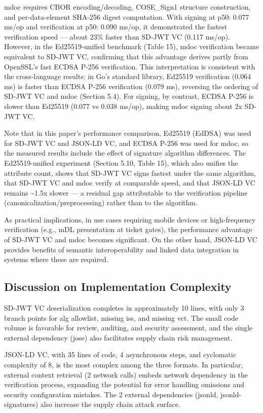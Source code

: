 \documentclass[conference]{IEEEtran}
\begin{document}
mdoc requires CBOR encoding/decoding, COSE\_Sign1 structure construction, and per-data-element SHA-256 digest computation. With signing at p50: 0.077 ms/op and verification at p50: 0.090 ms/op, it demonstrated the fastest verification speed --- about 23\% faster than SD-JWT VC (0.117 ms/op). However, in the Ed25519-unified benchmark (Table 15), mdoc verification became equivalent to SD-JWT VC, confirming that this advantage derives partly from OpenSSL's fast ECDSA P-256 verification. This interpretation is consistent with the cross-language results: in Go's standard library, Ed25519 verification (0.064 ms) is faster than ECDSA P-256 verification (0.079 ms), reversing the ordering of SD-JWT VC and mdoc (Section 5.4). For signing, by contrast, ECDSA P-256 is slower than Ed25519 (0.077 vs 0.038 ms/op), making mdoc signing about 2x SD-JWT VC.

Note that in this paper's performance comparison, Ed25519 (EdDSA) was used for SD-JWT VC and JSON-LD VC, and ECDSA P-256 was used for mdoc, so the measured results include the effect of signature algorithm differences. The Ed25519-unified experiment (Section 5.10, Table 15), which also unifies the attribute count, shows that SD-JWT VC signs fastest under the same algorithm, that SD-JWT VC and mdoc verify at comparable speed, and that JSON-LD VC remains \textasciitilde1.5x slower --- a residual gap attributable to the verification pipeline (canonicalization/preprocessing) rather than to the algorithm.

As practical implications, in use cases requiring mobile devices or high-frequency verification (e.g., mDL presentation at ticket gates), the performance advantage of SD-JWT VC and mdoc becomes significant. On the other hand, JSON-LD VC provides benefits of semantic interoperability and linked data integration in systems where these are required.

\subsection{Discussion on Implementation Complexity}

SD-JWT VC deserialization completes in approximately 10 lines, with only 3 branch points for alg allowlist, missing iss, and missing vct. The small code volume is favorable for review, auditing, and security assessment, and the single external dependency (jose) also facilitates supply chain risk management.

JSON-LD VC, with 35 lines of code, 4 asynchronous steps, and cyclomatic complexity of 8, is the most complex among the three formats. In particular, external context retrieval (2 network calls) embeds network dependency in the verification process, expanding the potential for error handling omissions and security configuration mistakes. The 2 external dependencies (jsonld, jsonld-signatures) also increase the supply chain attack surface.
\end{document}
